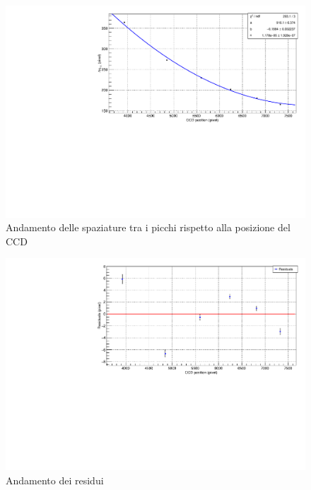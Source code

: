 \documentclass{article}
\begin{document}
	\begin{center}
		\begin{figure}[H]
			\centering
			\includegraphics[scale=0.38, angle=0]{campospento/deltaxruBoff.pdf}
			\setlength{\belowcaptionskip}{-20pt}
			\caption{Andamento delle spaziature tra i picchi rispetto alla posizione del CCD}
			\label{fig:deltaxruBoff}
		\end{figure}
	\end{center}

	\begin{center}
		\begin{figure}[H]
			\centering
			\includegraphics[scale=0.38, angle=0]{campospento/deltaxruBoffres.pdf}
			\setlength{\belowcaptionskip}{-20pt}
			\caption{Andamento dei residui}
			\label{fig:deltaxruBoffres}
		\end{figure}
	\end{center}
\end{document}
